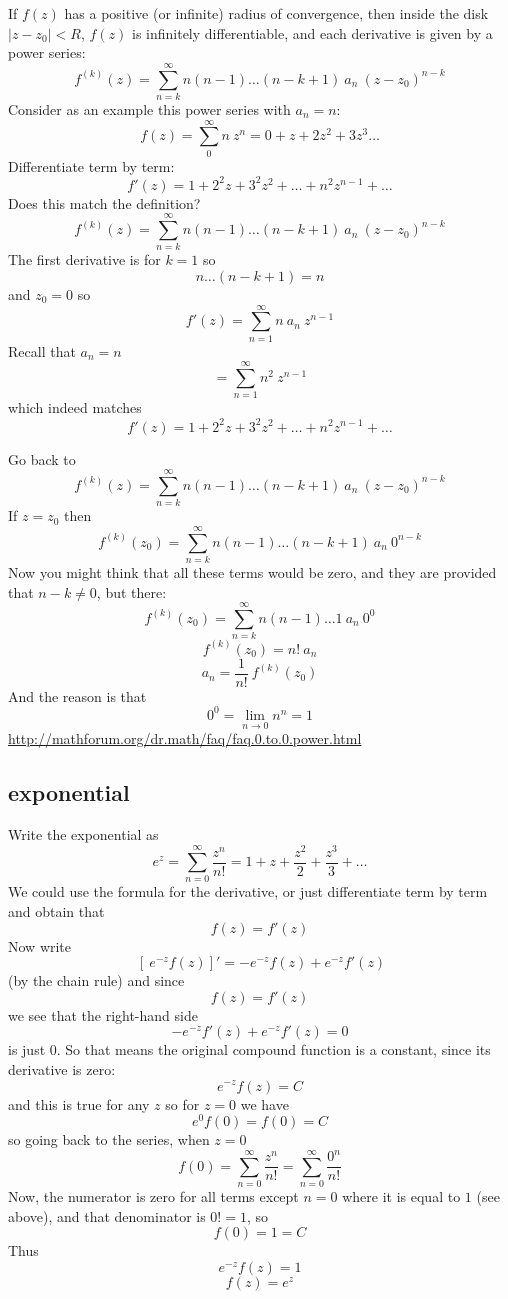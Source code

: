 \documentclass[11pt, oneside]{article}   	%
\begin{document}
If $f(z)$ has a positive (or infinite) radius of convergence, then inside the disk $|z-z_0| < R$, $f(z)$ is infinitely differentiable, and each derivative is given by a power series:
\[ f^{(k)}(z) = \sum_{n=k}^{\infty} n(n-1) \dots (n-k+1) \ a_n \ (z-z_0)^{n-k} \]
Consider as an example this power series with $a_n = n$:
\[ f(z) = \sum_0^{\infty} n \ z^n = 0 + z + 2z^2 + 3z^3 \dots \]
Differentiate term by term:
\[ f'(z) = 1 + 2^2 z + 3^2 z^2 + \dots + n^2 z^{n-1} + \dots \]
Does this match the definition?
\[ f^{(k)}(z) = \sum_{n=k}^{\infty} n(n-1) \dots (n-k+1) \ a_n \ (z-z_0)^{n-k} \]
The first derivative is for $k=1$ so
\[ n \dots (n-k+1) = n \]
and $z_0 = 0$ so
\[ f'(z) = \sum_{n=1}^{\infty}n \ a_n \ z^{n-1} \]
Recall that $a_n = n$
\[ = \sum_{n=1}^{\infty}n^2 \ z^{n-1} \]
which indeed matches
\[ f'(z) = 1 + 2^2 z + 3^2 z^2 + \dots + n^2 z^{n-1} + \dots \]

Go back to 
\[ f^{(k)}(z) = \sum_{n=k}^{\infty} n(n-1) \dots (n-k+1) \ a_n \ (z-z_0)^{n-k} \]
If $z = z_0$ then
\[ f^{(k)}(z_0) = \sum_{n=k}^{\infty} n(n-1) \dots (n-k+1) \ a_n \ 0^{n-k} \]
Now you might think that all these terms would be zero, and they are provided that $n-k \ne 0$, but there:
\[ f^{(k)}(z_0) = \sum_{n=k}^{\infty} n(n-1) \dots 1 \ a_n \ 0^{0} \]
\[ f^{(k)}(z_0) = n! \ a_n\]
\[ a_n = \frac{1}{n!} \ f^{(k)}(z_0)  \]
And the reason is that 
\[ 0^0 = \lim_{n \rightarrow 0} n^n = 1 \]
\url{http://mathforum.org/dr.math/faq/faq.0.to.0.power.html}

\subsection*{exponential}
Write the exponential as
\[ e^z = \sum_{n=0}^{\infty} \frac{z^n}{n!} = 1 + z + \frac{z^2}{2} + \frac{z^3}{3} + \dots \]
We could use the formula for the derivative, or just differentiate term by term and obtain that
\[ f(z) = f'(z) \]
Now write
\[ \ [ \ e^{-z} f(z) ] ' = -e^{-z} f(z) + e^{-z} f'(z) \]
(by the chain rule) and since 
\[ f(z) = f'(z) \]
we see that the right-hand side 
\[ -e^{-z} f'(z) + e^{-z} f'(z) = 0 \]
is just 0.  So that means the original compound function is a constant, since its derivative is zero:
\[ e^{-z} f(z) = C \]
and this is true for any $z$ so for $z=0$ we have
\[ e^0 f(0) = f(0) = C \]
so going back to the series, when $z=0$
\[ f(0) = \sum_{n=0}^{\infty} \frac{z^n}{n!} = \sum_{n=0}^{\infty} \frac{0^n}{n!} \]
Now, the numerator is zero for all terms except $n=0$ where it is equal to $1$ (see above), and that denominator is $0! = 1$, so 
\[ f(0) = 1 = C \]
Thus
\[ e^{-z} f(z) = 1 \]
\[ f(z) = e^z \]
\end{document}

